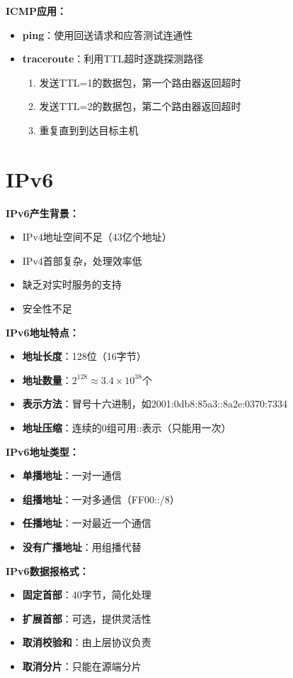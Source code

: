 \documentclass[lang=cn,newtx,10pt,scheme=chinese]{../../elegantbook}
\begin{document}
\textbf{ICMP应用：}
\begin{itemize}
  \item \textbf{ping}：使用回送请求和应答测试连通性
  \item \textbf{traceroute}：利用TTL超时逐跳探测路径
    \begin{enumerate}
      \item 发送TTL=1的数据包，第一个路由器返回超时
      \item 发送TTL=2的数据包，第二个路由器返回超时
      \item 重复直到到达目标主机
    \end{enumerate}
\end{itemize}

\section{IPv6}

\textbf{IPv6产生背景：}
\begin{itemize}
  \item IPv4地址空间不足（43亿个地址）
  \item IPv4首部复杂，处理效率低
  \item 缺乏对实时服务的支持
  \item 安全性不足
\end{itemize}

\textbf{IPv6地址特点：}
\begin{itemize}
  \item \textbf{地址长度}：128位（16字节）
  \item \textbf{地址数量}：$2^{128} \approx 3.4 \times 10^{38}$个
  \item \textbf{表示方法}：冒号十六进制，如2001:0db8:85a3::8a2e:0370:7334
  \item \textbf{地址压缩}：连续的0组可用::表示（只能用一次）
\end{itemize}

\textbf{IPv6地址类型：}
\begin{itemize}
  \item \textbf{单播地址}：一对一通信
  \item \textbf{组播地址}：一对多通信（FF00::/8）
  \item \textbf{任播地址}：一对最近一个通信
  \item \textbf{没有广播地址}：用组播代替
\end{itemize}

\textbf{IPv6数据报格式：}
\begin{itemize}
  \item \textbf{固定首部}：40字节，简化处理
  \item \textbf{扩展首部}：可选，提供灵活性
  \item \textbf{取消校验和}：由上层协议负责
  \item \textbf{取消分片}：只能在源端分片
\end{itemize}
\end{document}
